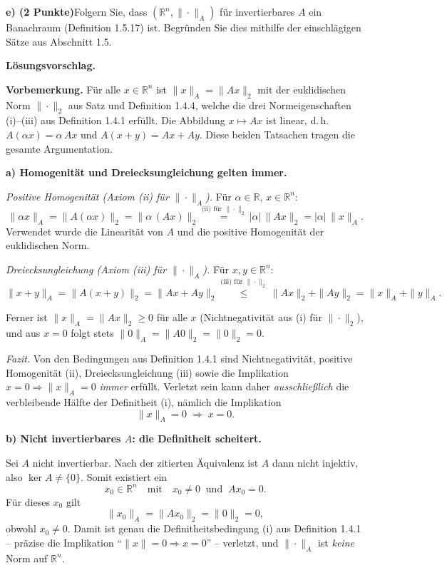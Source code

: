 \documentclass[a4paper,11pt]{article}
\begin{document}
\medskip
\textbf{e) (2 Punkte)}\quad Folgern Sie, dass $(\mathbb{R}^n,\|\cdot\|_A)$ für invertierbares $A$ ein Banachraum (Definition 1.5.17) ist. Begründen Sie dies mithilfe der einschlägigen Sätze aus Abschnitt 1.5.\par\smallskip
\textbf{L\"osungsvorschlag.}\par
\textbf{Vorbemerkung.} Für alle $x\in\mathbb{R}^n$ ist $\|x\|_A=\|Ax\|_2$ mit der euklidischen Norm $\|\cdot\|_2$ aus Satz und Definition 1.4.4, welche die drei Normeigenschaften (i)--(iii) aus Definition 1.4.1 erfüllt. Die Abbildung $x\mapsto Ax$ ist linear, d.\,h.\ $A(\alpha x)=\alpha\,Ax$ und $A(x+y)=Ax+Ay$. Diese beiden Tatsachen tragen die gesamte Argumentation.

\bigskip
\textbf{a) Homogenität und Dreiecksungleichung gelten immer.}

\emph{Positive Homogenität (Axiom (ii) für $\|\cdot\|_A$).} Für $\alpha\in\mathbb{R}$, $x\in\mathbb{R}^n$:
\[
\|\alpha x\|_A=\|A(\alpha x)\|_2=\|\alpha\,(Ax)\|_2
\overset{\text{(ii) für }\|\cdot\|_2}{=}|\alpha|\,\|Ax\|_2=|\alpha|\,\|x\|_A .
\]
Verwendet wurde die Linearität von $A$ und die positive Homogenität der euklidischen Norm.

\emph{Dreiecksungleichung (Axiom (iii) für $\|\cdot\|_A$).} Für $x,y\in\mathbb{R}^n$:
\[
\|x+y\|_A=\|A(x+y)\|_2=\|Ax+Ay\|_2
\overset{\text{(iii) für }\|\cdot\|_2}{\le}\|Ax\|_2+\|Ay\|_2=\|x\|_A+\|y\|_A .
\]

Ferner ist $\|x\|_A=\|Ax\|_2\ge 0$ für alle $x$ (Nichtnegativität aus (i) für $\|\cdot\|_2$), und aus $x=0$ folgt stets $\|0\|_A=\|A0\|_2=\|0\|_2=0$.

\emph{Fazit.} Von den Bedingungen aus Definition 1.4.1 sind Nichtnegativität, positive Homogenität (ii), Dreiecksungleichung (iii) sowie die Implikation $x=0\Rightarrow\|x\|_A=0$ \emph{immer} erfüllt. Verletzt sein kann daher \emph{ausschließlich} die verbleibende Hälfte der Definitheit (i), nämlich die Implikation
\[
\|x\|_A=0 \;\Longrightarrow\; x=0 .
\]

\bigskip
\textbf{b) Nicht invertierbares $A$: die Definitheit scheitert.}

Sei $A$ nicht invertierbar. Nach der zitierten Äquivalenz ist $A$ dann nicht injektiv, also $\ker A\neq\{0\}$. Somit existiert ein
\[
x_0\in\mathbb{R}^n \quad\text{mit}\quad x_0\neq 0 \ \text{ und }\ Ax_0=0 .
\]
Für dieses $x_0$ gilt
\[
\|x_0\|_A=\|Ax_0\|_2=\|0\|_2=0 ,
\]
obwohl $x_0\neq 0$. Damit ist genau die Definitheitsbedingung (i) aus Definition 1.4.1 -- präzise die Implikation ``$\|x\|=0\Rightarrow x=0$'' -- verletzt, und $\|\cdot\|_A$ ist \emph{keine} Norm auf $\mathbb{R}^n$.
\end{document}
